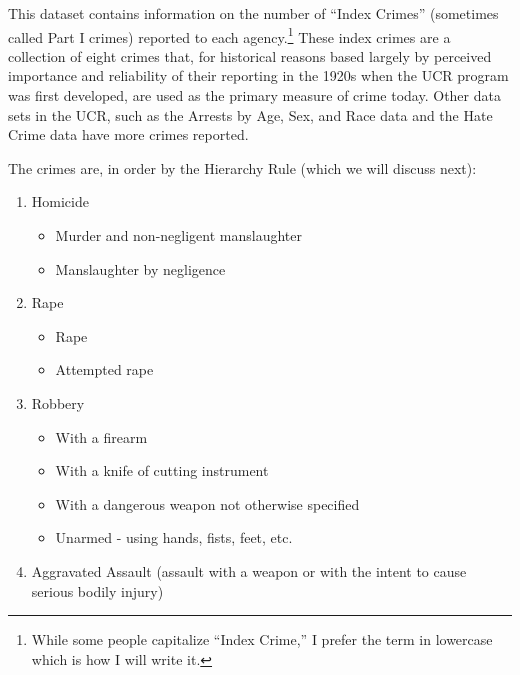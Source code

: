 \documentclass[
]{krantz}
\providecommand{\tightlist}{%
  \setlength{\itemsep}{0pt}\setlength{\parskip}{0pt}}
\begin{document}
This dataset contains information on the number of ``Index
Crimes'' (sometimes called Part I crimes) reported to each
agency.\footnote{While some people capitalize ``Index
  Crime,'' I prefer the term in lowercase which is how I
  will write it.} These index crimes are a collection of
eight crimes that, for historical reasons based largely by
perceived importance and reliability of their reporting in
the 1920s when the UCR program was first developed, are used
as the primary measure of crime today. Other data sets in
the UCR, such as the Arrests by Age, Sex, and Race data and
the Hate Crime data have more crimes reported.

The crimes are, in order by the Hierarchy Rule (which we
will discuss next):

\begin{enumerate}
\def\labelenumi{\arabic{enumi}.}
\tightlist
\item
  Homicide

  \begin{itemize}
  \tightlist
  \item
    Murder and non-negligent manslaughter\\
  \item
    Manslaughter by negligence
  \end{itemize}
\item
  Rape

  \begin{itemize}
  \tightlist
  \item
    Rape\\
  \item
    Attempted rape\\
  \end{itemize}
\item
  Robbery

  \begin{itemize}
  \tightlist
  \item
    With a firearm\\
  \item
    With a knife of cutting instrument\\
  \item
    With a dangerous weapon not otherwise specified\\
  \item
    Unarmed - using hands, fists, feet, etc.\\
  \end{itemize}
\item
  Aggravated Assault (assault with a weapon or with the
  intent to cause serious bodily injury)


\end{enumerate}
\end{document}
